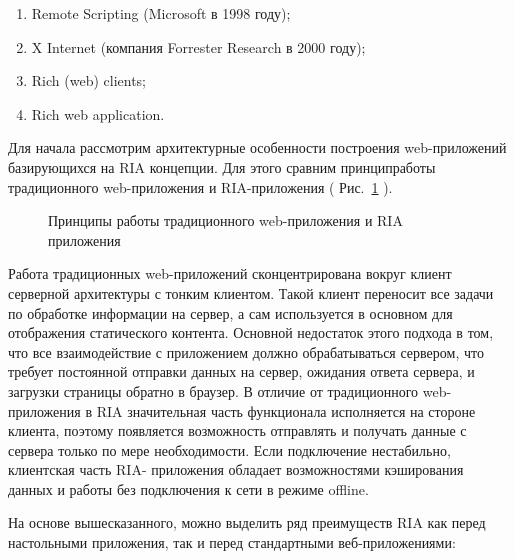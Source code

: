 \begin{enumerate}

\item Remote Scripting (Microsoft в 1998 году);
\item X Internet (компания Forrester Research в 2000 году);
\item Rich (web) clients; 
\item Rich web application. 

\end{enumerate}

Для начала рассмотрим архитектурные особенности построения web-приложений базирующихся 
на RIA  концепции.  Для этого сравним принципработы традиционного web-приложения и 
RIA-приложения ( Рис.~\ref{ris:principlesRIA.png} ).  
\begin{figure}[h]
\caption{Принципы работы традиционного web-приложения и RIA приложения}
\label{ris:principlesRIA.png}
\end{figure}

Работа традиционных web-приложений сконцентрирована вокруг клиент серверной архитектуры 
с тонким клиентом.  Такой клиент переносит все задачи по обработке информации на сервер, 
а сам используется в основном для отображения статического контента.  Основной 
недостаток этого подхода в том,  что все взаимодействие с приложением должно 
обрабатываться сервером,  что требует постоянной отправки данных на сервер,  
ожидания ответа сервера, и загрузки страницы обратно в браузер. В отличие от 
традиционного web-приложения в RIA  значительная часть функционала исполняется на 
стороне клиента,  поэтому появляется возможность отправлять и получать данные с сервера 
только по мере необходимости.  Если подключение нестабильно,  клиентская часть RIA- 
приложения обладает возможностями кэширования данных и работы без подключения к сети в 
режиме offline.

На основе вышесказанного, можно выделить ряд преимуществ RIA  как перед настольными приложения, 
так и перед стандартными веб-приложениями:

